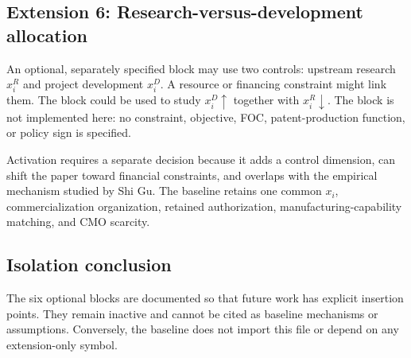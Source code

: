 \subsection{Extension 6: Research-versus-development allocation}
\label{subsec:p11-research-development}

An optional, separately specified block may use two controls: upstream research
\(x_i^R\) and project development \(x_i^D\). A resource or financing
constraint might link them. The block could be used to study
\(x_i^D\uparrow\) together with \(x_i^R\downarrow\). The block is not
implemented here: no constraint, objective, FOC, patent-production function,
or policy sign is specified.

Activation requires a separate decision because it adds a control dimension,
can shift the paper toward financial constraints, and overlaps with the
empirical mechanism studied by Shi Gu. The baseline retains one common
\(x_i\), commercialization organization, retained authorization,
manufacturing-capability matching, and CMO scarcity.

\subsection{Isolation conclusion}
\label{subsec:p11-isolation}

The six optional blocks are documented so that future work has explicit
insertion points. They remain inactive and cannot be cited as baseline
mechanisms or assumptions. Conversely, the baseline does not import this
file or depend on any extension-only symbol.
